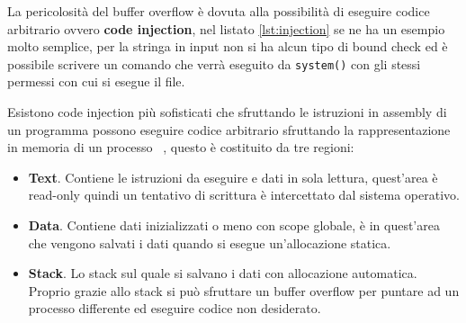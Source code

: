 \documentclass[Lau,binding=0.6cm]{sapthesis}
\begin{document}






La pericolosità del buffer overflow è dovuta alla possibilità di eseguire codice arbitrario ovvero \textbf{code injection}, nel listato \ref{lst:injection} se ne ha un esempio molto semplice, per la stringa in input non si ha alcun tipo di bound check ed è possibile scrivere un comando che verrà eseguito da \colorbox{backcolour}{\texttt{system()}} con gli stessi permessi con cui si esegue il file. 




Esistono code injection più sofisticati che sfruttando le istruzioni in assembly di un programma possono eseguire codice arbitrario sfruttando la rappresentazione in memoria di un processo ~\cite{stack_smashing_ffp}, questo è costituito da tre regioni:

\begin{itemize}
    \item \textbf{Text}. Contiene le istruzioni da eseguire e dati in sola lettura, quest'area è read-only quindi un tentativo di scrittura è intercettato dal sistema operativo. 
    \item \textbf{Data}. Contiene dati inizializzati o meno con scope globale, è in quest'area che vengono salvati i dati quando si esegue un'allocazione statica.
    \item \textbf{Stack}. Lo stack sul quale si salvano i dati con allocazione automatica. Proprio grazie allo stack si può sfruttare un buffer overflow per puntare ad un processo differente ed eseguire codice non desiderato.
\end{itemize}
\end{document}
